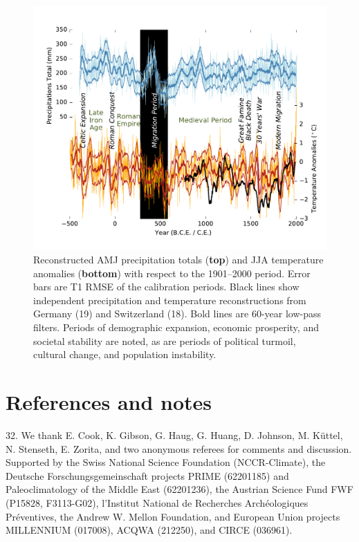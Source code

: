 \documentclass[10pt,a4paper,twoside,onecolumn]{article}
\begin{document}
\begin{myfont}
\begin{multicols}{3}
\begin{figure}[h]
\includegraphics[width=1\textwidth]{BuntgenFig4_1}
\caption{Reconstructed AMJ precipitation totals (\textbf{top}) and JJA temperature anomalies (\textbf{bottom}) with respect to the 1901–2000 period. Error bars are T1 RMSE of the calibration periods. Black lines show independent precipitation and temperature reconstructions from Germany (19) and Switzerland (18). Bold lines are 60-year low-pass filters. Periods of demographic expansion, economic prosperity, and societal stability are noted, as are periods of political turmoil, cultural change, and population instability.}
\label{Fig4}
\end{figure}


\section*{References and notes}




32. We thank E. Cook, K. Gibson, G. Haug, G. Huang,
D. Johnson, M. Küttel, N. Stenseth, E. Zorita, and two
anonymous referees for comments and discussion.
Supported by the Swiss National Science Foundation
(NCCR-Climate), the Deutsche Forschungsgemeinschaft
projects PRIME (62201185) and Paleoclimatology of
the Middle East (62201236), the Austrian Science
Fund FWF (P15828, F3113-G02), l’Institut National
de Recherches Archéologiques Préventives, the
Andrew W. Mellon Foundation, and European Union
projects MILLENNIUM (017008), ACQWA (212250),
and CIRCE (036961).


\end{multicols}
\end{myfont}
\end{document}
